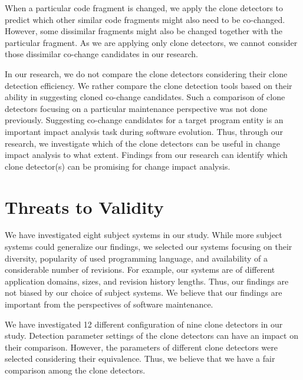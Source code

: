 \documentclass[review]{elsarticle}
\begin{document}

\vspace{1mm}
When a particular code fragment is changed, we apply the clone detectors to predict which other similar code fragments might also need to be co-changed. However, some dissimilar fragments might also be changed together with the particular fragment. As we are applying only clone detectors, we cannot consider those dissimilar co-change candidates in our research.

\vspace{1mm}
In our research, we do not compare the clone detectors considering their clone detection efficiency. We rather compare the clone detection tools based on their ability in suggesting cloned co-change candidates. Such a comparison of clone detectors focusing on a particular maintenance perspective was not done previously. Suggesting co-change candidates for a target program entity is an important impact analysis \citep{book-change-impact} task during software evolution. Thus, through our research, we investigate which of the clone detectors can be useful in change impact analysis to what extent. Findings from our research can identify which clone detector(s) can be promising for change impact analysis. 

\vspace{2mm}
\section{Threats to Validity}
\label{the-threat-validity}
We have investigated eight subject systems in our study. While more subject systems could generalize our findings, we selected our systems focusing on their diversity, popularity of used programming language, and availability of a considerable number of revisions. For example, our systems are of different application domains, sizes, and revision history lengths. Thus, our findings are not biased by our choice of subject systems. We believe that our findings are important from the perspectives of software maintenance.

We have investigated 12 different configuration of nine clone detectors in our study. 
Detection parameter settings of the clone detectors can have an impact on their comparison. However, the parameters of different clone detectors were selected considering their equivalence. Thus, we believe that we have a fair comparison among the clone detectors.
\end{document}
